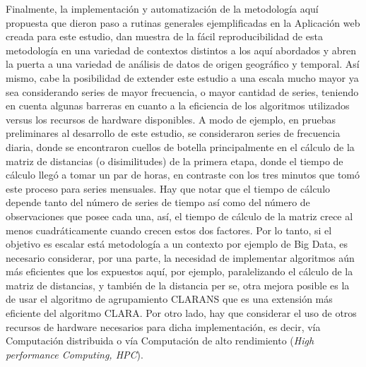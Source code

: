 \documentclass[12pt,oneside]{book}\usepackage[]{graphicx}\usepackage[]{color}
\theoremstyle{definition} %
\begin{document}


Finalmente, la implementación y automatización de la metodología aquí propuesta que dieron paso a rutinas generales ejemplificadas en la Aplicación web creada para este estudio, dan muestra de la fácil reproducibilidad de esta metodología en una variedad de contextos distintos a los aquí abordados y abren la puerta a una variedad de análisis de datos de origen geográfico y temporal. 
Así mismo, cabe la posibilidad de extender este estudio a una escala mucho mayor ya sea considerando series de mayor frecuencia, o mayor cantidad de series, teniendo en cuenta algunas barreras en cuanto a la eficiencia de los algoritmos utilizados versus los recursos de hardware disponibles. A modo de ejemplo, en pruebas preliminares al desarrollo de este estudio, se consideraron series de frecuencia diaria, donde se encontraron cuellos de botella principalmente en el cálculo de la matriz de distancias (o disimilitudes) de la primera etapa, donde el tiempo de cálculo llegó a tomar un par de horas, en contraste con los tres minutos que tomó este proceso para series mensuales. Hay que notar que el tiempo de cálculo depende tanto del número de series de tiempo así como del número de observaciones que posee cada una, así, el tiempo de cálculo de la matriz crece al menos cuadráticamente cuando crecen estos dos factores. Por lo tanto, si el objetivo es escalar está metodología a un contexto por ejemplo de Big Data, es necesario considerar, por una parte, la necesidad de implementar algoritmos aún más eficientes que los expuestos aquí, por ejemplo, paralelizando el cálculo de la matriz de distancias, y también de la distancia per se, otra mejora posible es la de usar el algoritmo de agrupamiento CLARANS que es una extensión más eficiente del algoritmo CLARA. Por otro lado, hay que considerar el uso de otros recursos de hardware necesarios para dicha implementación, es decir, vía Computación distribuida o vía Computación de alto rendimiento (\textit{High performance Computing, HPC}).


\end{document}
